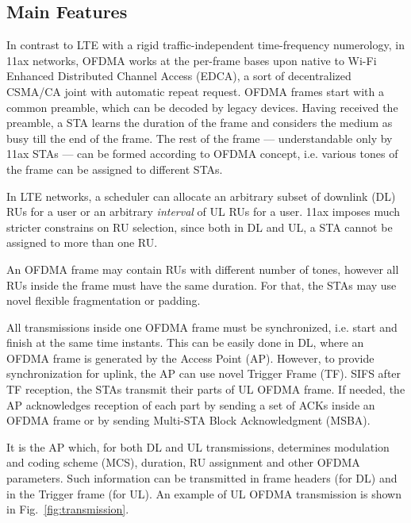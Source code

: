 \subsection{Main Features}

In contrast to LTE with a rigid traffic-independent time-frequency numerology, in 11ax networks, OFDMA works at the per-frame bases upon native to Wi-Fi Enhanced Distributed Channel Access (EDCA), a sort of decentralized CSMA/CA joint with automatic repeat request. OFDMA frames start with a common preamble, which can be decoded by legacy devices. Having received the preamble, a STA learns the duration of the frame and considers the medium as busy till the end of the frame.
The rest of the frame --- understandable only by 11ax STAs --- can be formed according to OFDMA concept, i.e. various tones of the frame can be assigned to different STAs. 

In LTE networks, a scheduler can allocate an arbitrary subset of downlink (DL) RUs for a user or an arbitrary \emph{interval} of UL RUs for a user.
11ax imposes much stricter constrains on RU selection, since both in DL and UL, a STA cannot be assigned to more than one RU.

An OFDMA frame may contain RUs with different number of tones, however all RUs inside the frame must have the same duration.
For that, the STAs may use novel flexible fragmentation or padding. 

All transmissions inside one OFDMA frame must be synchronized, i.e. start and finish at the same time instants.
This can be easily done in DL, where an OFDMA frame is generated by the Access Point (AP).
However, to provide synchronization for uplink, the AP can use novel Trigger Frame (TF).
SIFS after TF reception, the STAs transmit their parts of UL OFDMA frame.
If needed, the AP acknowledges reception of each part by sending a set of ACKs inside an OFDMA frame or by sending Multi-STA Block Acknowledgment (MSBA).

It is the AP which, for both DL and UL transmissions, determines modulation and coding scheme (MCS), duration, RU assignment and other OFDMA parameters. Such information can be transmitted in frame headers (for DL) and in the Trigger frame (for UL). An example of UL OFDMA transmission is shown in Fig.~\ref{fig:transmission}. 

